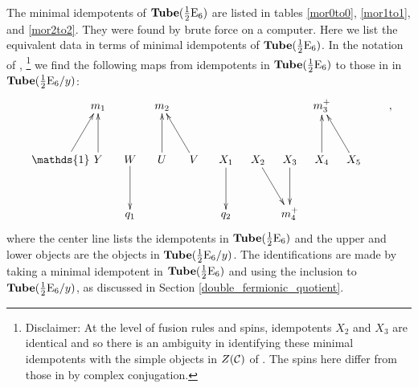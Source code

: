 The minimal idempotents of $\textbf{Tube}(\frac{1}{2}\text{E}_6)$ are listed in tables \ref{mor0to0}, \ref{mor1to1}, and \ref{mor2to2}.
They were found by brute force on a computer.
Here we list the equivalent data in terms of minimal idempotents of $\textbf{Tube}(\frac{1}{2}\text{E}_6)$.
In the notation of \cite{Hong2008},
\footnote{Disclaimer: At the level of fusion rules and spins,
 idempotents $X_2$ and $X_3$ are identical and so there is an ambiguity in identifying these minimal idempotents with the simple objects in $Z(\mathcal{C})$ of \cite{Hong2008}.
The spins here differ from those in \cite{Hong2008} by complex conjugation. } 
we find the following maps from idempotents in $\textbf{Tube}(\frac{1}{2}\text{E}_6)$ to those in in $\textbf{Tube}(\frac{1}{2}\text{E}_6 / y)$:
\begin{align}
\xymatrix @!0 @M=1mm @C=10mm{
& &m_1 && m_2 && &&& m_3^+ &&  \\
 \\
 \quad&\mathds{1} \ar[ruu] \quad & Y \ar[uu] & W\ar[dd] & U\ar[uu] & V \ar[uul] & X_1 \ar[dd] & X_{2}\ar[ddr] &X_{3} \ar[dd] & X_4\ar[uu] & X_5\ar[uul] &  \\
\\
&&&q_1& &&q_2 &&m_4^+& &&  \\
},
\end{align}
where the center line lists the idempotents in $\textbf{Tube}(\frac{1}{2}\text{E}_6)$ and the upper and lower objects are the objects in $\textbf{Tube}(\frac{1}{2}\text{E}_6 / y)$.
The identifications are made by taking a minimal idempotent in $\textbf{Tube}(\frac{1}{2}\text{E}_6)$ and using the inclusion to $\textbf{Tube}(\frac{1}{2}\text{E}_6/y)$, 
as discussed in Section \ref{double_fermionic_quotient}.




